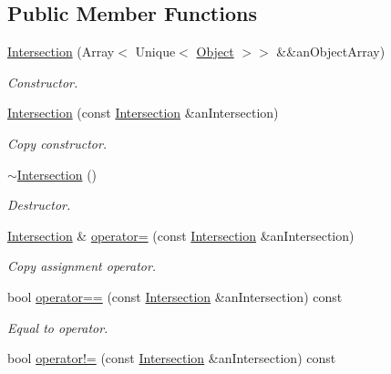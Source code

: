 \subsection*{Public Member Functions}
\begin{DoxyCompactItemize}
\item 
\hyperlink{classostk_1_1math_1_1geom_1_1d2_1_1_intersection_a52e7ba577832b73a1eb5c95eaddf2834}{Intersection} (Array$<$ Unique$<$ \hyperlink{classostk_1_1math_1_1geom_1_1d2_1_1_object}{Object} $>$$>$ \&\&an\+Object\+Array)
\begin{DoxyCompactList}\small\item\em Constructor. \end{DoxyCompactList}\item 
\hyperlink{classostk_1_1math_1_1geom_1_1d2_1_1_intersection_a8d8b22032a70a03974e51bf2f8d57cd7}{Intersection} (const \hyperlink{classostk_1_1math_1_1geom_1_1d2_1_1_intersection}{Intersection} \&an\+Intersection)
\begin{DoxyCompactList}\small\item\em Copy constructor. \end{DoxyCompactList}\item 
\hyperlink{classostk_1_1math_1_1geom_1_1d2_1_1_intersection_a2f329039a38a83defdf625ea590d1124}{$\sim$\+Intersection} ()
\begin{DoxyCompactList}\small\item\em Destructor. \end{DoxyCompactList}\item 
\hyperlink{classostk_1_1math_1_1geom_1_1d2_1_1_intersection}{Intersection} \& \hyperlink{classostk_1_1math_1_1geom_1_1d2_1_1_intersection_aecdb671aaa9d6a56ec1209fe3035790e}{operator=} (const \hyperlink{classostk_1_1math_1_1geom_1_1d2_1_1_intersection}{Intersection} \&an\+Intersection)
\begin{DoxyCompactList}\small\item\em Copy assignment operator. \end{DoxyCompactList}\item 
bool \hyperlink{classostk_1_1math_1_1geom_1_1d2_1_1_intersection_a840b26425c0c8f35a8530c338821851f}{operator==} (const \hyperlink{classostk_1_1math_1_1geom_1_1d2_1_1_intersection}{Intersection} \&an\+Intersection) const
\begin{DoxyCompactList}\small\item\em Equal to operator. \end{DoxyCompactList}\item 
bool \hyperlink{classostk_1_1math_1_1geom_1_1d2_1_1_intersection_a6a5cd04fff08e2bd74d99a29544b7fe2}{operator!=} (const \hyperlink{classostk_1_1math_1_1geom_1_1d2_1_1_intersection}{Intersection} \&an\+Intersection) const
$$
\end{DoxyCompactItemize}
